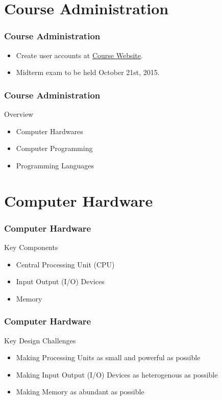 \documentclass[10pt, compress]{beamer}
\begin{document}
\prepareCover

\section{Course Administration}

\begin{frame}[fragile]
	\frametitle{Course Administration}
	\begin{itemize}
		\item[] Create user accounts at \href{http://www.ghorbanzade.com}{Course Website}.
		\item[] Midterm exam to be held October 21st, 2015.
	\end{itemize}
\end{frame}

\begin{frame}[fragile]
	\frametitle{Course Administration}
	\begin{block}{Overview}
		\begin{itemize}
			\item[] Computer Hardwares
			\item[] Computer Programming
			\item[] Programming Languages
		\end{itemize}
	\end{block}
\end{frame}

\section{Computer Hardware}

\begin{frame}
	\frametitle{Computer Hardware}
	\begin{block}{Key Components}
		\begin{itemize}
			\item[] Central Processing Unit (CPU)
			\item[] Input Output (I/O) Devices
			\item[] Memory
		\end{itemize}
	\end{block}
\end{frame}

\begin{frame}
	\frametitle{Computer Hardware}
	\begin{block}{Key Design Challenges}
		\begin{itemize}
			\item[] Making Processing Units as small and powerful as possible
			\item[] Making Input Output (I/O) Devices as heterogenous as possible
			\item[] Making Memory as abundant as possible
		\end{itemize}
	\end{block}
\end{frame}
\end{document}
